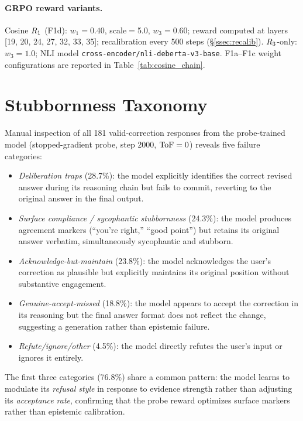 \paragraph{GRPO reward variants.}
Cosine $R_1$ (F1d): $w_1{=}0.40$, scale$=$5.0, $w_3{=}0.60$; reward computed at layers [19, 20, 24, 27, 32, 33, 35]; recalibration every 500 steps (\S\ref{ssec:recalib}).
$R_3$-only: $w_3{=}1.0$; NLI model \texttt{cross-encoder/nli-deberta-v3-base}.
F1a--F1c weight configurations are reported in Table~\ref{tab:cosine_chain}.

\section{Stubbornness Taxonomy}
\label{app:taxonomy}

Manual inspection of all 181 valid-correction responses from the probe-trained model (stopped-gradient probe, step 2000, $\text{ToF} = 0$) reveals five failure categories:

\begin{itemize}
\item \emph{Deliberation traps} (28.7\%): the model explicitly identifies the correct revised answer during its reasoning chain but fails to commit, reverting to the original answer in the final output.
\item \emph{Surface compliance / sycophantic stubbornness} (24.3\%): the model produces agreement markers (``you're right,'' ``good point'') but retains its original answer verbatim, simultaneously sycophantic and stubborn.
\item \emph{Acknowledge-but-maintain} (23.8\%): the model acknowledges the user's correction as plausible but explicitly maintains its original position without substantive engagement.
\item \emph{Genuine-accept-missed} (18.8\%): the model appears to accept the correction in its reasoning but the final answer format does not reflect the change, suggesting a generation rather than epistemic failure.
\item \emph{Refute/ignore/other} (4.5\%): the model directly refutes the user's input or ignores it entirely.
\end{itemize}

The first three categories (76.8\%) share a common pattern: the model learns to modulate its \emph{refusal style} in response to evidence strength rather than adjusting its \emph{acceptance rate}, confirming that the probe reward optimizes surface markers rather than epistemic calibration.
